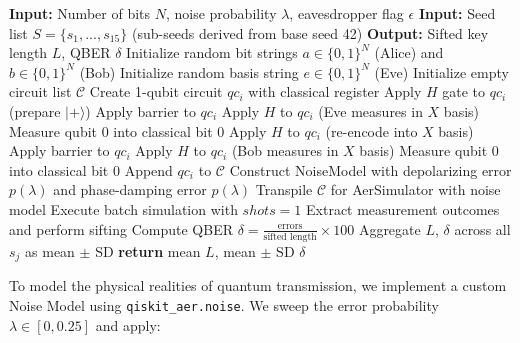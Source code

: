 \documentclass[conference]{IEEEtran}
\begin{document}
\begin{algorithm}[htbp]
\caption{Qiskit-Based B92 Simulation Framework}
\label{alg:qiskit}
\begin{algorithmic}[1]
\State \textbf{Input:} Number of bits $N$, noise probability $\lambda$, eavesdropper flag $\epsilon$
\State \textbf{Input:} Seed list $S = \{s_1, ..., s_{15}\}$ (sub-seeds derived from base seed 42)
\State \textbf{Output:} Sifted key length $L$, QBER $\delta$
    \State Initialize random bit strings $a \in \{0,1\}^N$ (Alice) and $b \in \{0,1\}^N$ (Bob)
        \State Initialize random basis string $e \in \{0,1\}^N$ (Eve)
    \EndIf
    \State Initialize empty circuit list $\mathcal{C}$
        \State Create 1-qubit circuit $qc_i$ with classical register
            \State Apply $H$ gate to $qc_i$ (prepare $|+\rangle$)
        \EndIf
            \State Apply barrier to $qc_i$
                \State Apply $H$ to $qc_i$ (Eve measures in $X$ basis)
            \EndIf
            \State Measure qubit 0 into classical bit 0
                \State Apply $H$ to $qc_i$ (re-encode into $X$ basis)
            \EndIf
        \EndIf
        \State Apply barrier to $qc_i$
            \State Apply $H$ to $qc_i$ (Bob measures in $X$ basis)
        \EndIf
        \State Measure qubit 0 into classical bit 0
        \State Append $qc_i$ to $\mathcal{C}$
    \EndFor
    \State Construct NoiseModel with depolarizing error $p(\lambda)$ and phase-damping error $p(\lambda)$
    \State Transpile $\mathcal{C}$ for AerSimulator with noise model
    \State Execute batch simulation with $shots=1$
    \State Extract measurement outcomes and perform sifting
    \State Compute QBER $\delta = \frac{\text{errors}}{\text{sifted length}} \times 100$
\EndFor
\State Aggregate $L$, $\delta$ across all $s_j$ as mean $\pm$ SD
\State \textbf{return} mean $L$, mean $\pm$ SD $\delta$
\end{algorithmic}
\end{algorithm}

To model the physical realities of quantum transmission, we implement a custom Noise Model using \texttt{qiskit\_aer.noise}. We sweep the error probability $\lambda \in [0, 0.25]$ and apply:
\end{document}
